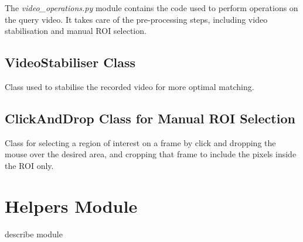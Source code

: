 The \textit{video\_operations.py} module contains the code used to perform operations on the query video. It takes care of the pre-processing steps, including video stabilisation and manual ROI selection. 


\subsection{VideoStabiliser Class}
\label{sec:code-VideoStabiliser}

Class used to stabilise the recorded video for more optimal matching.




\subsection{ClickAndDrop Class for Manual ROI Selection}
\label{sec:code-ClickAndDrop}

Class for selecting a region of interest on a frame by click and dropping the mouse over the desired area, and cropping that frame to include the pixels inside the ROI only.




\clearpage
\section{Helpers Module}

describe module



% 

